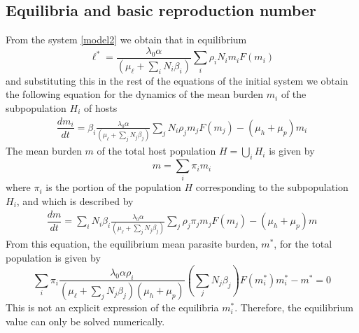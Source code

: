 \documentclass[eng]{MMSB-class-eng}
\begin{document}
\subsection{Equilibria and basic reproduction number} 
From the system \eqref{model2} we obtain that in equilibrium
\begin{equation}
\ell^*=\frac{  \lambda_0 \alpha }{(\mu_{\ell}+\sum_i N_i \beta_i  )}   \sum_i \rho_{i} N_{i} m_{i} F(m_{i}) 
\end{equation} 
and substituting this in the rest of the equations of the initial system we obtain the following equation for the dynamics of the mean burden $m_{i}$ of the subpopulation $H_{i}$ of hosts
\begin{equation}
\begin{split}
\dfrac{dm_{i}}{dt}=\beta_{i} \frac{\lambda_0\alpha}{ (\mu_{\ell}+\sum_j N_j \beta_j  ) }  
\sum_j    N_i \rho_{j}  m_{j} F(m_{j})  - (\mu_h+\mu_p) m_{i}%
\end{split}
\end{equation}
The mean burden $m$ of the total host population $H=\bigcup_i H_i$ is given by
\begin{equation}
m=\sum_i \pi_i m_{i} 
\end{equation}
where $\pi_i$ is the portion of the population $H$ corresponding to the subpopulation $H_i$, and which is described by
\begin{equation}
\begin{split}
\dfrac{dm}{dt}= %
\sum_i N_i \beta_{i} 
\frac{ \lambda_0 \alpha }{(\mu_{\ell}+\sum_j N_j \beta_j  )}  
\sum_j \rho_{j} \pi_{j} m_{j} F(m_{j})   -(\mu_{h}+\mu_p) m%
\end{split}
\end{equation}
From this equation, the equilibrium mean parasite burden, $m^*$, for the total population is given by
\begin{equation}
\sum_i \pi_i \frac{ \lambda_0 \alpha \rho_{i}}{ (\mu_{\ell}+\sum_j N_j \beta_j  )(\mu_{h}+\mu_p)} 
\left( \sum_j N_{j} \beta_{j} \right) F( m^*_{i}) m^*_{i} - m^*=0 
\end{equation}
This is not an explicit expression of the equilibria $m_{i}^*$. Therefore, the equilibrium value can only be solved numerically.
\end{document}
